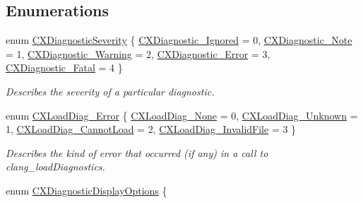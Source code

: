 \subsection*{Enumerations}
\begin{DoxyCompactItemize}
\item 
enum \hyperlink{group__CINDEX__DIAG_gabff210a02d448bf64e8aee79b2241370}{C\+X\+Diagnostic\+Severity} \{ \newline
\hyperlink{group__CINDEX__DIAG_ggabff210a02d448bf64e8aee79b2241370a6bc5575700fec4fcde75bb88ab85eb21}{C\+X\+Diagnostic\+\_\+\+Ignored} = 0, 
\hyperlink{group__CINDEX__DIAG_ggabff210a02d448bf64e8aee79b2241370abd868cb73ea129d1f77476211fea4494}{C\+X\+Diagnostic\+\_\+\+Note} = 1, 
\hyperlink{group__CINDEX__DIAG_ggabff210a02d448bf64e8aee79b2241370af4384404f204c3bbb614e5ee2654426e}{C\+X\+Diagnostic\+\_\+\+Warning} = 2, 
\hyperlink{group__CINDEX__DIAG_ggabff210a02d448bf64e8aee79b2241370ae896fe295133ecfe92587bf4dffcd994}{C\+X\+Diagnostic\+\_\+\+Error} = 3, 
\newline
\hyperlink{group__CINDEX__DIAG_ggabff210a02d448bf64e8aee79b2241370a5df88ea55245aedf53ab0f4ce3a6737c}{C\+X\+Diagnostic\+\_\+\+Fatal} = 4
 \}\begin{DoxyCompactList}\small\item\em Describes the severity of a particular diagnostic. \end{DoxyCompactList}
\item 
enum \hyperlink{group__CINDEX__DIAG_gafccf4d49329805ac24e6dc005aafc848}{C\+X\+Load\+Diag\+\_\+\+Error} \{ \hyperlink{group__CINDEX__DIAG_ggafccf4d49329805ac24e6dc005aafc848a2aeb81c1571c99b95cdce1b6b5b9b3d5}{C\+X\+Load\+Diag\+\_\+\+None} = 0, 
\hyperlink{group__CINDEX__DIAG_ggafccf4d49329805ac24e6dc005aafc848a3b56c96ea13c1d67e23297924674ce1b}{C\+X\+Load\+Diag\+\_\+\+Unknown} = 1, 
\hyperlink{group__CINDEX__DIAG_ggafccf4d49329805ac24e6dc005aafc848ac08b95e9ba65ec7436038554d74f795e}{C\+X\+Load\+Diag\+\_\+\+Cannot\+Load} = 2, 
\hyperlink{group__CINDEX__DIAG_ggafccf4d49329805ac24e6dc005aafc848ad06582a09b2adbbded48bde1106214d6}{C\+X\+Load\+Diag\+\_\+\+Invalid\+File} = 3
 \}\begin{DoxyCompactList}\small\item\em Describes the kind of error that occurred (if any) in a call to {\ttfamily clang\+\_\+load\+Diagnostics}. \end{DoxyCompactList}
\item 
enum \hyperlink{group__CINDEX__DIAG_ga0545c7c3ef36a397c44d142b0385b8d1}{C\+X\+Diagnostic\+Display\+Options} \{ \newline

\end{DoxyCompactItemize}
